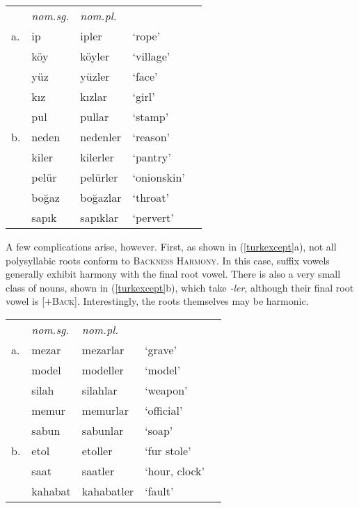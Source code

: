 \begin{example}
\label{turknom}
\begin{tabular}{lllll}
   & \emph{nom.sg.} & \emph{nom.pl.} \\
a. & {ip}           & {ipler}    & `rope'         & \citep[][216]{Clements1982} \\
   & {köy}          & {köyler}   & `village'      \\
   & {yüz}          & {yüzler}   & `face'         \\
   & {kız}          & {kızlar}   & `girl'         \\
   & {pul}          & {pullar}   & `stamp'        \\
b. & {neden}        & {nedenler} & `reason'       & \citep{TELL} \\
   & {kiler}        & {kilerler} & `pantry'       \\
   & {pelür}        & {pelürler} & `onionskin'    \\
   & {boğaz}        & {boğazlar} & `throat'       \\
   & {sapık}        & {sapıklar} & `pervert'      \\
\end{tabular}
\end{example}

A few complications arise, however. First, as shown in (\ref{turkexcept}a), not all polysyllabic roots conform to \textsc{Backness Harmony}. In this case, suffix vowels generally exhibit harmony with the final root vowel. There is also a very small class of nouns, shown in (\ref{turkexcept}b), which take \emph{-ler}, although their final root vowel is [$+$\textsc{Back}]. Interestingly, the roots themselves may be harmonic.

\begin{example} 
\label{turkexcept}
\begin{tabular}{lllll}
   & \emph{nom.sg.} & \emph{nom.pl.}&                    \\
a. & {mezar}        & {mezarlar}    & `grave'       & \citep{TELL}       \\
   & {model}        & {modeller}    & `model'                            \\
   & {silah}        & {silahlar}    & `weapon'                           \\
   & {memur}        & {memurlar}    & `official'                         \\
   & {sabun}        & {sabunlar}    & `soap'                             \\
b. & {etol}         & {etoller}     & `fur stole'   & \citep{Goksel2005} \\
   & {saat}         & {saatler}     & `hour, clock' 	              \\
   & {kahabat}      & {kahabatler}  & `fault'       \\
\end{tabular}
\end{example}

